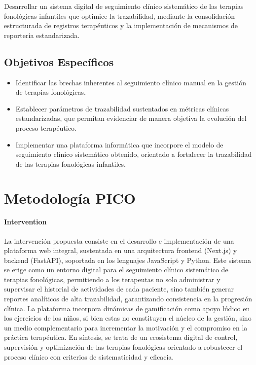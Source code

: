 \documentclass[12pt, oneside]{article}
\begin{document}
Desarrollar un sistema digital de seguimiento clínico sistemático de las terapias fonológicas infantiles que optimice la trazabilidad, mediante la consolidación estructurada de registros terapéuticos y la implementación de mecanismos de reportería estandarizada.

\subsection{Objetivos Específicos}

\begin{itemize}
    \item Identificar las brechas inherentes al seguimiento clínico manual en la gestión de terapias fonológicas.
    \item Establecer parámetros de trazabilidad sustentados en métricas clínicas estandarizadas, que permitan evidenciar de manera objetiva la evolución del proceso terapéutico.
    \item Implementar una plataforma informática que incorpore el modelo de seguimiento clínico sistemático obtenido, orientado a fortalecer la trazabilidad de las terapias fonológicas infantiles.
\end{itemize}

\section{\textbf{Metodología PICO}}

\paragraph{\textbf{Intervention}}

La intervención propuesta consiste en el desarrollo e implementación de una plataforma web integral, sustentada en una arquitectura frontend (Next.js) y backend (FastAPI), soportada en los lenguajes JavaScript y Python. Este sistema se erige como un entorno digital para el seguimiento clínico sistemático de terapias fonológicas, permitiendo a los terapeutas no solo administrar y supervisar el historial de actividades de cada paciente, sino también generar reportes analíticos de alta trazabilidad, garantizando consistencia en la progresión clínica. La plataforma incorpora dinámicas de gamificación como apoyo lúdico en los ejercicios de los niños, si bien estas no constituyen el núcleo de la gestión, sino un medio complementario para incrementar la motivación y el compromiso en la práctica terapéutica. En síntesis, se trata de un ecosistema digital de control, supervisión y optimización de las terapias fonológicas orientado a robustecer el proceso clínico con criterios de sistematicidad y eficacia.
\end{document}
